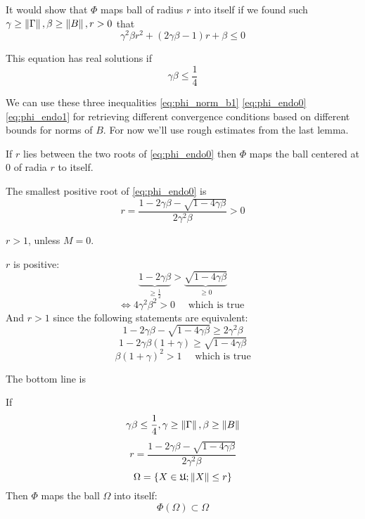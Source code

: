 \documentclass{article}
\begin{document}
    It would show that \( \Phi \) maps ball of radius \( r \) into itself
    if we found such \( \gamma\geq\left\|{\Gamma}\right\|, \beta\geq\left\|{B}\right\|, r>0 \)
    that
\begin{equation}\label{eq:phi_endo0}
    \gamma^2\beta r^2 + (2\gamma\beta - 1) r + \beta \leq 0
\end{equation}

This equation has real solutions if
\begin{equation}\label{eq:phi_endo1}
    \gamma\beta\leq\frac14
\end{equation}

We can use these three inequalities \eqref{eq:phi_norm_b1} \eqref{eq:phi_endo0} \eqref{eq:phi_endo1}
for retrieving different convergence conditions based on different bounds for norms of \( B \).
For now we'll use rough estimates from the last lemma.

\begin{propose}
    If \( r \) lies between the two roots of \eqref{eq:phi_endo0}
    then \( \Phi \) maps the ball centered at \( 0 \) of radia \( r \) to itself.

    The smallest positive root of \eqref{eq:phi_endo0} is
    \begin{equation}\label{eq:endo_r0}
        r = \frac{1 - 2\gamma\beta - \sqrt{1-4\gamma\beta}}{2 \gamma^2 \beta} > 0
    \end{equation}

    \( r>1 \), unless \( M=0 \).
\end{propose}
\begin{TRIVIA}
    \( r \) is positive:
    \[\underbrace{1-2\gamma\beta}_{\geq\frac12} > \underbrace{\sqrt{1-4\gamma\beta}}_{\geq0}\]
    \[\iff 4\gamma^2\beta^2 > 0 \quad\text{ which is true }\]
    And \( r>1 \) since the following statements are equivalent:
    \[1 - 2\gamma\beta - \sqrt{1-4\gamma\beta} \geq 2 \gamma^2 \beta\]
    \[1 - 2\gamma\beta(1 +  \gamma) \geq \sqrt{1-4\gamma\beta}\]
    \[\beta(1+\gamma)^2>1 \quad\text{ which is true}\]
\end{TRIVIA}

The bottom line is
\begin{thm}\label{thm:endo}
    If
    \[\gamma\beta\leq\frac14, \gamma\geq\left\|{\Gamma}\right\|, \beta\geq\left\|{B}\right\|\]
    \[r = \frac{1 - 2\gamma\beta - \sqrt{1-4\gamma\beta}}{2 \gamma^2 \beta}\]
    \[\Omega = \{ X\in\mathfrak U; \left\|{X}\right\| \leq r \}\]
    Then
    \( \Phi \) maps the ball \( \Omega \) into itself:
    \[\Phi(\Omega)\subset\Omega\]
\end{thm}
\end{document}
